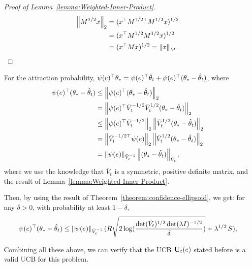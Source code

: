 \begin{proof}[Proof of Lemma~\ref{lemma:Weighted-Inner-Product}]
\begin{align*}
\left\|M^{1/2} x\right\|_2
&= (x^\top {M^{1/2 \top}} M^{1/2} x)^{1/2}  \\
&= (x^\top {M^{1/2}} M^{1/2} x)^{1/2} \\
&= (x^\top M x)^{1/2} = \left\|x\right\|_M .
\end{align*}
\end{proof}

For the attraction probability, $\psi(e)^\top \mathbf{\theta}_* = \psi(e)^\top \hat{\mathbf{\theta}}_t + \psi(e)^\top (\mathbf{\theta}_* - \hat{\mathbf{\theta}}_t)$, where
\begin{align*}
\psi(e)^\top (\mathbf{\theta}_* - \hat{\mathbf{\theta}}_t)
&\le \left\|\psi(e)^\top (\mathbf{\theta}_* - \hat{\mathbf{\theta}}_t)\right\|_2  \\
&= \left\|\psi(e)^\top {\bar{V}_{t}}^{-1/2} {\bar{V}_{t}}^{1/2} (\mathbf{\theta}_* - \hat{\mathbf{\theta}}_t)\right\|_2 \\
&\le \left\|\psi(e)^\top {\bar{V}_{t}}^{-1/2}\right\|_2 \left\|{\bar{V}_{t}}^{1/2} (\mathbf{\theta}_* - \hat{\mathbf{\theta}}_t)\right\|_2 \\
&= \left\|{{\bar{V}_{t}}^{-1/2 \top}} \psi(e)\right\|_2 \left\|{\bar{V}_{t}}^{1/2} (\mathbf{\theta}_* - \hat{\mathbf{\theta}}_t)\right\|_2 \\
&= \left\| \psi(e)\right\|_{\bar{V}_{t}^{-1}} \left\|(\mathbf{\theta}_* - \hat{\mathbf{\theta}}_t)\right\|_{\bar{V}_{t}} ,
\end{align*}
where we use the knowledge that $\bar{V}_{t}$ is a symmetric, positive definite matrix, and the result of Lemma~\ref{lemma:Weighted-Inner-Product}.

Then, by using the result of Theorem~\ref{theorem:confidence-ellipsoid}, we get:
for any $\delta > 0$, with probability at least $1-\delta$,
\begin{align*}
\psi(e)^\top (\mathbf{\theta}_* - \hat{\mathbf{\theta}}_t) \le
 \left\| \psi(e)\right\|_{\bar{V}_{t}^{-1}} (R \sqrt{2 \log( \frac{\det (\bar{V}_{t})^{1/2}\det(\lambda I)^{-1/2}}{\delta} )} + \lambda^{1/2}\, S) ,
\end{align*}

Combining all these above, we can verify that the UCB $\mathbf{U}_t(e)$ stated before is a valid UCB for this problem. 






